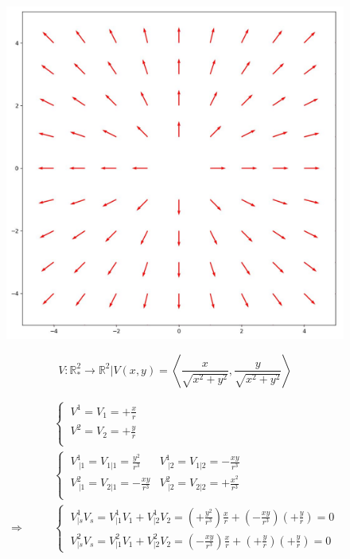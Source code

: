 \begin{figure}[H]
\centering
\begin{minipage}[H]{.4\textwidth}
\vspace{0pt}
\includegraphics[scale=.3]{unitvectorfield2.jpg}
\end{minipage}\hfill
\begin{minipage}[H]{0.4\textwidth}
\vspace{50pt}
$$V:\mathbb{R}_*^2\rightarrow \mathbb{R}^2|V(x,y) = \left< \frac{x}{\sqrt{x^2+y^2}},\frac{y}{\sqrt{x^2+y^2}} \right>$$
\end{minipage}
\end{figure}
\begin{align}
\ & \left \{ \begin{array}{c}
\ V^1 = V_1 = +\frac{x}{r}\\
\ V^2 = V_2 = +\frac{y}{r}\\
\end{array}\right.\\
\ & \left \{ \begin{array}{cc}
\ V^1_{\ |1} =  V_{1|1} = \frac{y^2}{r^3}&V^1_{\ |2} =  V_{1|2} = -\frac{xy}{r^3}\\
\ V^2_{\ |1} =  V_{2|1} = -\frac{xy}{r^3}&V^2_{\ |2} =  V_{2|2} = +\frac{x^2}{r^3}\\
\end{array}\right.\\
\Rightarrow \quad\quad &\left \{ \begin{array}{c} \  V^1_{|s}V_s = V^1_{|1}V_1+V^1_{|2}V_2 = (+\frac{y^2}{r^3})\frac{x}{r}+ (-\frac{xy}{r^3})(+\frac{y}{r}) =  0\\
\ V^2_{|s}V_s = V^2_{|1}V_1+V^2_{|2}V_2 = (-\frac{xy}{r^3})\frac{x}{r}+ (+\frac{y}{r})(+\frac{y}{r}) =  0
\end{array} \right.
\end{align}
